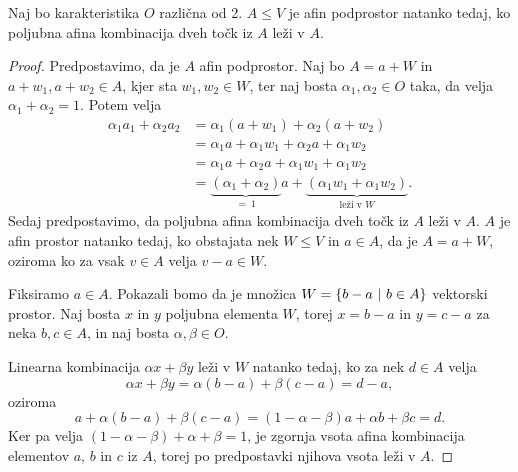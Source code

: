 \begin{trditev}
    Naj bo karakteristika $O$ različna od 2. $A \leq V$ je afin podprostor natanko tedaj, ko poljubna afina kombinacija dveh točk iz $A$ leži v $A$.
\end{trditev}

\begin{proof}
    Predpostavimo, da je $A$ afin podprostor.
    Naj bo $A = a + W$ in $a + w_1, a + w_2 \in A$, kjer sta $w_1, w_2 \in W$, ter naj bosta $\alpha_1, \alpha_2 \in O$ taka, da velja $\alpha_1 + \alpha_2 = 1$. Potem velja
    \begin{align*}
    \alpha_1 a_1 + \alpha_2 a_2 &= \alpha_1 (a + w_1) + \alpha_2 (a + w_2) \\
    &= \alpha_1 a + \alpha_1 w_1 + \alpha_2 a + \alpha_1 w_2 \\
    &= \alpha_1 a + \alpha_2 a + \alpha_1 w_1 + \alpha_1 w_2 \\
    &= \underbrace{(\alpha_1 + \alpha_2)}_{=\: 1} a + \underbrace{(\alpha_1 w_1 + \alpha_1 w_2)}_{\text{leži v $W$}}.
    \end{align*}
    Sedaj predpostavimo, da poljubna afina kombinacija dveh točk iz $A$ leži v $A$.
    $A$ je afin prostor natanko tedaj, ko obstajata nek $W \leq V$ in $a \in A$, da je $A = a + W$, oziroma ko za vsak $v \in A$ velja $v - a \in W$.
    
    Fiksiramo $a \in A$. Pokazali bomo da je množica $W = \left\{b-a~\middle\vert~b \in A\right\}$ vektorski prostor.
    Naj bosta $x$ in $y$ poljubna elementa $W$, torej $x = b - a$ in $y = c - a$ za neka $b, c \in A$, in naj bosta $\alpha, \beta \in O$.
    
    Linearna kombinacija $\alpha x + \beta y$ leži v $W$ natanko tedaj, ko za nek $d \in A$ velja
    \[
    \alpha x + \beta y = \alpha (b - a) + \beta (c - a) = d - a,
    \]
    oziroma
    \[
    a + \alpha (b - a) + \beta (c - a) = (1 - \alpha - \beta) a + \alpha b + \beta c = d.
    \]
    Ker pa velja $(1 - \alpha - \beta) + \alpha + \beta = 1$, je zgornja vsota afina kombinacija elementov $a$, $b$ in $c$ iz $A$, torej po predpostavki njihova vsota leži v $A$.
\end{proof}

